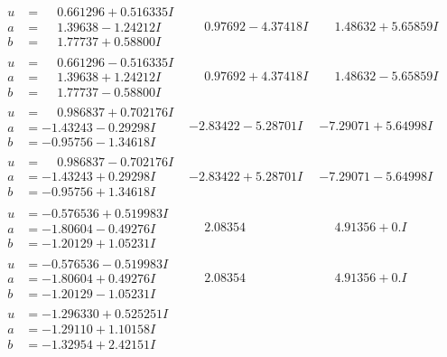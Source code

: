 \documentclass[1p]{elsarticle_modified}
\theoremstyle{definition}
\begin{document}
$$\begin{array}{c|c|c}
\begin{aligned}
u &= \phantom{-}0.661296 + 0.516335 I \\
a &= \phantom{-}1.39638 - 1.24212 I \\
b &= \phantom{-}1.77737 + 0.58800 I\end{aligned}
 & \phantom{-}0.97692 - 4.37418 I & \phantom{-}1.48632 + 5.65859 I \\ \hline\begin{aligned}
u &= \phantom{-}0.661296 - 0.516335 I \\
a &= \phantom{-}1.39638 + 1.24212 I \\
b &= \phantom{-}1.77737 - 0.58800 I\end{aligned}
 & \phantom{-}0.97692 + 4.37418 I & \phantom{-}1.48632 - 5.65859 I \\ \hline\begin{aligned}
u &= \phantom{-}0.986837 + 0.702176 I \\
a &= -1.43243 - 0.29298 I \\
b &= -0.95756 - 1.34618 I\end{aligned}
 & -2.83422 - 5.28701 I & -7.29071 + 5.64998 I \\ \hline\begin{aligned}
u &= \phantom{-}0.986837 - 0.702176 I \\
a &= -1.43243 + 0.29298 I \\
b &= -0.95756 + 1.34618 I\end{aligned}
 & -2.83422 + 5.28701 I & -7.29071 - 5.64998 I \\ \hline\begin{aligned}
u &= -0.576536 + 0.519983 I \\
a &= -1.80604 - 0.49276 I \\
b &= -1.20129 + 1.05231 I\end{aligned}
 & \phantom{-}2.08354\phantom{ +0.000000I} & \phantom{-}4.91356 + 0. I\phantom{ +0.000000I} \\ \hline\begin{aligned}
u &= -0.576536 - 0.519983 I \\
a &= -1.80604 + 0.49276 I \\
b &= -1.20129 - 1.05231 I\end{aligned}
 & \phantom{-}2.08354\phantom{ +0.000000I} & \phantom{-}4.91356 + 0. I\phantom{ +0.000000I} \\ \hline\begin{aligned}
u &= -1.296330 + 0.525251 I \\
a &= -1.29110 + 1.10158 I \\
b &= -1.32954 + 2.42151 I\end{aligned}

\end{array}$$
\end{document}
